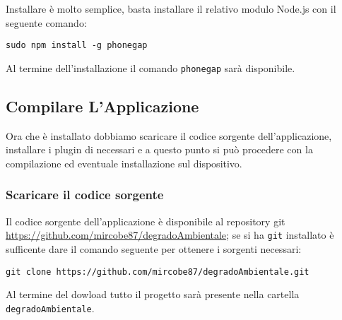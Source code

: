         Installare \pg{} è molto semplice, basta installare il relativo modulo 
        Node.js con il seguente comando:
        \begin{lstlisting}[language=plane]
 sudo npm install -g phonegap
        \end{lstlisting}
        Al termine dell'installazione il comando \texttt{phonegap} sarà 
        disponibile.
        
    \subsection{Compilare L'Applicazione}
        Ora che \pg{} è installato dobbiamo scaricare il codice sorgente 
        dell'applicazione, installare i plugin di \pg{} necessari e a questo 
        punto si può procedere con la compilazione ed eventuale installazione 
        sul dispositivo.
        
        \subsubsection{Scaricare il codice sorgente}
            Il codice sorgente dell'applicazione \pg{} è disponibile al 
            repository git 
            \url{https://github.com/mircobe87/degradoAmbientale}; se si ha 
            \texttt{git} installato è sufficente dare il comando seguente per 
            ottenere i sorgenti necessari:
            \begin{lstlisting}[language=plane]
 git clone https://github.com/mircobe87/degradoAmbientale.git
            \end{lstlisting}
            Al termine del dowload tutto il progetto sarà presente nella 
            cartella \texttt{degradoAmbientale}.
            
